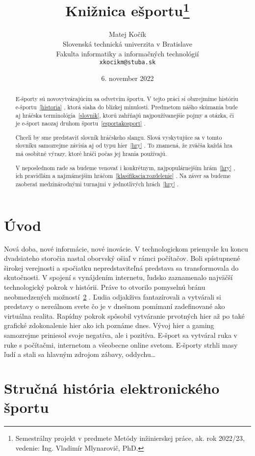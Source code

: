 \documentclass[10pt,oneside,slovak,a4paper]{article}
\title{Knižnica ešportu\thanks{Semestrálny projekt v predmete Metódy inžinierskej práce, ak. rok 2022/23, vedenie: Ing. Vladimír Mlynarovič, PhD.}} %
\author{Matej Kočík\\[2pt]
	{\small Slovenská technická univerzita v Bratislave}\\
	{\small Fakulta informatiky a informačných technológií}\\
	{\small \texttt{xkocikm@stuba.sk}}
	}
\date{\small 6. november 2022} %
\begin{document}
\maketitle

\begin{abstract}

E-športy sú novovytvárajúcim sa odvetvím športu. V tejto práci si obzrejmíme históriu e-športu~\ref{historia} , ktorá siaha do blízkej minulosti. Predmetom nášho skúmania bude aj hráčska terminológia~\ref{slovnik}, ktorú zahŕňajú najpoužívanejšie pojmy a otázka, či je e-šport naozaj druhom športu~\ref{esportakosport} . 

Chceli by sme predstaviť slovník hráčskeho slangu. Slová vyskytujúce sa v tomto slovníku samozrejme závisia aj od typu hier~\ref{hry} . To znamená, že zväčša každá hra má osobitné výrazy, ktoré hráči počas jej hrania používajú. 

V neposlednom rade sa budeme venovať i konkrétnym, najpopulárnejším hrám~\ref{hry} , ich pravidlám a najznámejším hráčom~\ref{klasifikacia:rozdelenie} . Na záver sa budeme zaoberať medzinárodnými turnajmi v jednotlivých hrách~\ref{hry} . 
\end{abstract}



\section{Úvod}


Nová doba, nové informácie, nové inovácie. V technologickom priemysle ku koncu dvadsiateho storočia nastal oborvský ošiaľ v rámci počítačov. Boli spístupnené širokej verejnosti a spočiatku nepredstaviteľná predstava sa transformovala do skutočnosti. V spojení s vynájdením internetu, ľudsko zaznamenalo najväčší technologický pokrok v histórii. Práve to otvorilo pomyselnú bránu neobmedzených možností~\ref{historia} . Ľudia odjakživa fantazírovali a vytvárali si predstavy o nereálnom svete čo je v dnešnom pomímaní zadefinované ako virtuálna realita. Rapídny pokrok spôsobil vytváranie prvotných hier až po také grafické zdokonalenie hier ako ich poznáme dnes. Vývoj hier a gaming samozrejme priniesol svoje negatíva, ale i pozitíva. E-šport sa vytváral ruka v ruke s počítačmi, internetom a všeobecne online svetom. E-športy strhli masy ľudí a stali sa hlavným zdrojom zábavy, oddychu…\cite{a1}


\section{Stručná história elektronického športu} \label{historia}
\end{document}
